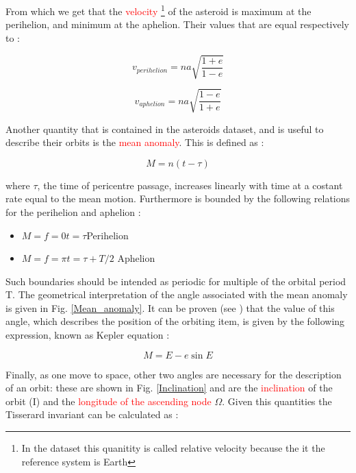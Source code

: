 \documentclass[12pt,%
               a4paper,%
               oneside,openany,%
               titlepage,%
               headinclude,footinclude,%
               BCOR5mm,%
               cleardoublepage=empty,%
               tablecaptionabove,%
               floatperchapter,
               ]{scrreprt}                 %
\begin{document}
From which we get that the \textcolor{red}{velocity} \footnote{In the dataset this quanitity is called relative velocity because the it the reference system is Earth} of the asteroid is maximum at the perihelion, and minimum at the aphelion. Their values that are equal respectively to \cite{murray1999solar}:

\begin{equation}
v_{perihelion}=na\sqrt{\dfrac{1+e}{1-e}}
\end{equation}

\begin{equation}
v_{aphelion}=na\sqrt{\dfrac{1-e}{1+e}}
\end{equation}

Another quantity that is contained in the asteroids dataset, and is useful to describe their orbits is the \textcolor{red}{mean anomaly}. This is defined as \cite{murray1999solar}:

\begin{equation}
M=n(t-\tau)
\end{equation}

where $\tau$, the time of pericentre passage, increases linearly with time at a costant rate equal to the mean motion. Furthermore is bounded by the following relations for the perihelion and aphelion \cite{murray1999solar}:

\begin{itemize}
\item $M=f=0$\quad$t=\tau$\quad Perihelion
\item $M=f=\pi$\quad$t=\tau+T/2$ \quad Aphelion
\end{itemize}

Such boundaries should be intended as periodic for multiple of the orbital period T. The geometrical interpretation of the angle associated with the mean anomaly is given in Fig. \ref{Mean_anomaly}. It can be proven (see \cite{murray1999solar}) that the value of this angle, which describes the position of the orbiting item, is given by the following expression, known as Kepler equation \cite{murray1999solar}:

\begin{equation}
M=E-e\sin E
\end{equation}

Finally, as one move to space, other two angles are necessary for the description of an orbit: these are shown in Fig. \ref{Inclination} and are the \textcolor{red}{inclination} of the orbit (I) and the \textcolor{red}{longitude of the ascending node} $\Omega$. Given this quantities the Tisserard invariant can be calculated as \cite{murray1999solar}:
\end{document}
